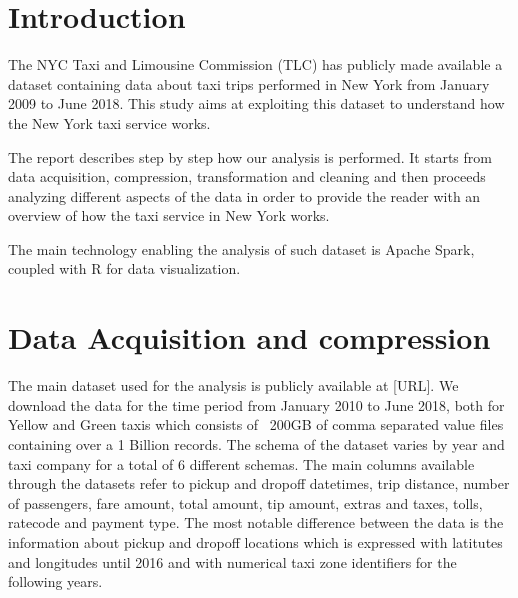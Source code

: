 \documentclass{acm_proc_article-sp-sigmod09}
\begin{document}
\maketitle
\begin{abstract}
This paper provides a sample of a \LaTeX\ document which conforms to
the formatting guidelines for ACM SIG Proceedings.
It complements the document \textit{Author's Guide to Preparing
ACM SIG Proceedings Using \LaTeX$2_\epsilon$\ and Bib\TeX}. This
source file has been written with the intention of being
compiled under \LaTeX$2_\epsilon$\ and BibTeX.

The developers have tried to include every imaginable sort
of ``bells and whistles", such as a subtitle, footnotes on
title, subtitle and authors, as well as in the text, and
every optional component (e.g. Acknowledgments, Additional
Authors, Appendices), not to mention examples of
equations, theorems, tables and figures.

To make best use of this sample document, run it through \LaTeX\
and BibTeX, and compare this source code with the printed
output produced by the dvi file.
\end{abstract}

\section{Introduction}
The NYC Taxi and Limousine Commission (TLC) has publicly made available a dataset containing data about taxi trips performed in New York from January 2009 to June 2018. This study aims at exploiting this dataset to understand how the New York taxi service works.

The report describes step by step how our analysis is performed. It starts from data acquisition, compression, transformation and cleaning and then proceeds analyzing different aspects of the data in order to provide the reader with an overview of how the taxi service in New York works.

The main technology enabling the analysis of such dataset is Apache Spark, coupled with R for data visualization.

\section{Data Acquisition and compression}

The main dataset used for the analysis is publicly available at [URL]. We download the data for the time period from January 2010 to June 2018, both for Yellow and Green taxis which consists of ~200GB of comma separated value files containing over a 1 Billion records. The schema of the dataset varies by year and taxi company for a total of 6 different schemas. The main columns available through the datasets refer to pickup and dropoff datetimes, trip distance, number of passengers, fare amount, total amount, tip amount, extras and taxes, tolls, ratecode and payment type. The most notable difference between the data is the information about pickup and dropoff locations which is expressed with latitutes and longitudes until 2016 and with numerical taxi zone identifiers for the following years.
\end{document}
